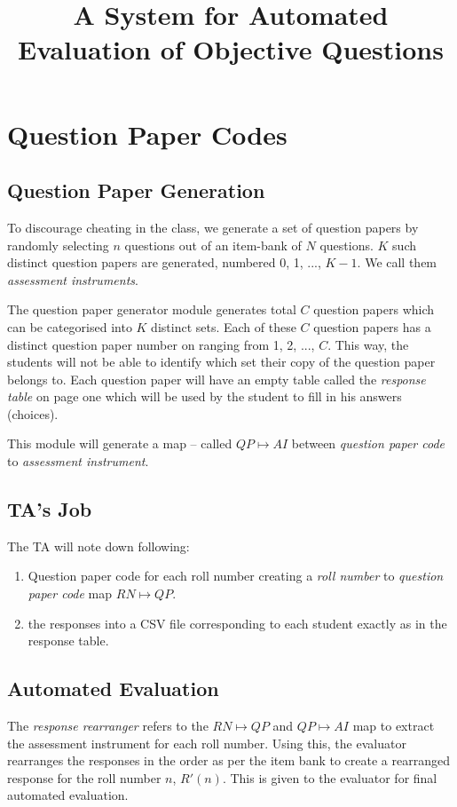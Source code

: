 \documentclass[12pt]{article}
\title{A System for Automated Evaluation of Objective Questions}
\begin{document}
\section{Question Paper Codes}

\subsection{Question Paper Generation}
To discourage cheating in the class, we generate a set of question papers by randomly selecting $n$ questions out of an item-bank of $N$ questions. $K$ such distinct question papers are generated, numbered 0, 1, ..., $K-1$. We call them \emph{assessment instruments}.

The question paper generator module generates total $C$ question papers which can be categorised into $K$ distinct sets. Each of these $C$ question papers has a distinct question paper number on ranging from 1, 2, ..., $C$. This way, the students will not be able to identify which set their copy of the question paper belongs to. Each question paper will have an empty table called the \emph{response table} on page one which will be used by the student to fill in his answers (choices).

This module will generate a map -- called $QP\mapsto AI$ between \emph{question paper code} to \emph{assessment instrument}.

\subsection{TA's Job}
The TA will note down following:
\begin{enumerate}
\item Question paper code for each roll number creating a \emph{roll number} to \emph{question paper code} map $RN\mapsto QP$.
\item the responses into a CSV file corresponding to each student exactly as in the response table.
\end{enumerate}

\subsection{Automated Evaluation}
The \emph{response rearranger} refers to the $RN\mapsto QP$ and $QP\mapsto AI$ map to extract the assessment instrument for each roll number. Using this, the evaluator rearranges the responses in the order as per the item bank to create a rearranged response for the roll number $n$, $R'(n)$. This is given to the evaluator for final automated evaluation.
\end{document}
